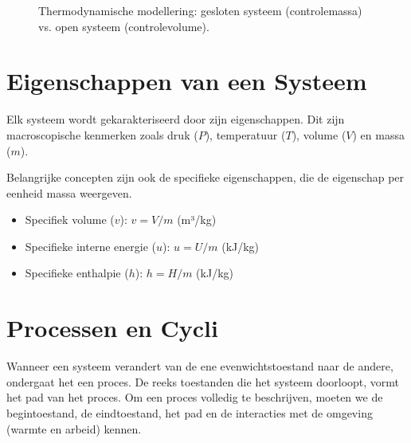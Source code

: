 \documentclass[a4paper,11pt,twoside]{report}
\begin{document}
\begin{figure}[H]
    \centering
    \caption{Thermodynamische modellering: gesloten systeem (controlemassa) vs. open systeem (controlevolume).}
\end{figure}

\section{Eigenschappen van een Systeem}
Elk systeem wordt gekarakteriseerd door zijn eigenschappen. Dit zijn macroscopische kenmerken zoals druk ($P$), temperatuur ($T$), volume ($V$) en massa ($m$).

Belangrijke concepten zijn ook de specifieke eigenschappen, die de eigenschap per eenheid massa weergeven.

\begin{itemize}
    \item Specifiek volume ($v$): $v = V/m$ (m³/kg)
    \item Specifieke interne energie ($u$): $u = U/m$ (kJ/kg)
    \item Specifieke enthalpie ($h$): $h = H/m$ (kJ/kg)
\end{itemize}




\section{Processen en Cycli}
Wanneer een systeem verandert van de ene evenwichtstoestand naar de andere, ondergaat het een proces. De reeks toestanden die het systeem doorloopt, vormt het pad van het proces. Om een proces volledig te beschrijven, moeten we de begintoestand, de eindtoestand, het pad en de interacties met de omgeving (warmte en arbeid) kennen.
\end{document}
